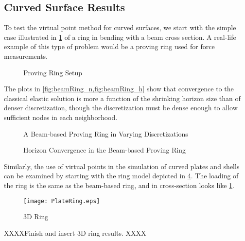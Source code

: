 \FloatBarrier
\subsection{Curved Surface Results}
To test the virtual point method for curved surfaces, we start with the simple case illustrated in \cref{fig:ProvingRing} of a ring in bending with a beam cross section.
A real-life example of this type of problem would be a proving ring used for force measurements.
%
\begin{figure}[tbhp]
  \centering
  
  \caption{Proving Ring Setup}
  \label{fig:ProvingRing}
\end{figure}
%
The plots in \cref{fig:beamRing_n,fig:beamRing_h} show that convergence to the classical elastic solution is more a function of the shrinking horizon size than of denser discretization, though the discretization must be dense enough to allow sufficient nodes in each neighborhood.
%
\begin{figure}[tbhp]
  \centering
  \resizebox{0.8\linewidth}{!}{}
  \caption{A Beam-based Proving Ring in Varying Discretizations}
  \label{fig:beamRing_n}
\end{figure}
%
%
\begin{figure}[tbhp]
  \centering
  \resizebox{0.8\linewidth}{!}{}
  \caption{Horizon Convergence in the Beam-based Proving Ring}
  \label{fig:beamRing_h}
\end{figure}
%

Similarly, the use of virtual points in the simulation of curved plates and shells can be examined by starting with the ring model depicted in \cref{fig:PlateRing}.
The loading of the ring is the same as the beam-based ring, and in cross-section looks like \cref{fig:ProvingRing}.
%
\begin{figure}[h]
  \centering
  \texttt{[image: PlateRing.eps]}
  \caption{3D Ring}
  \label{fig:PlateRing}
\end{figure}
%

 XXXXFinish and insert 3D ring results. XXXX


